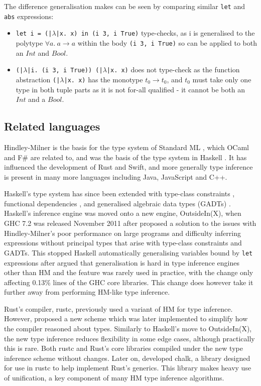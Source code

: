 \documentclass[a4paper,fleqn,oneside,12pt]{report}
\begin{document}
The difference generalisation makes can be seen by comparing similar \texttt{let} and \texttt{abs} expressions:
\begin{itemize}
  \item \texttt{let i = (|$\lambda$|x. x) in (i 3, i True)} type-checks, as i is generalised to the polytype $\forall a.\ a \rightarrow a$ within the body \texttt{(i 3, i True)} so can be applied to both an $Int$ and $Bool$.
  \item \texttt{(|$\lambda$|i. (i 3, i True)) (|$\lambda$|x. x)} does not type-check as the function abstraction \texttt{(|$\lambda$|x. x)} has the monotype $t_0 \rightarrow t_0$, and $t_0$ must take only one type in both tuple parts as it is not for-all qualified - it cannot be both an $Int$ and a $Bool$.
\end{itemize}

\subsection{Related languages}

Hindley-Milner is the basis for the type system of Standard ML \citep{ref15}, which OCaml and F\# are related to, and was the basis of the type system in Haskell \citep{ref16}. It has influenced the development of Rust and Swift, and more generally type inference is present in many more languages including Java, JavaScript and C++.

Haskell's type system has since been extended with type-class constraints \citep{ref17}, functional dependencies \citep{ref18}, and generalised algebraic data types (GADTs) \citep{ref19}. Haskell’s inference engine was moved onto a new engine, OutsideIn(X), when GHC 7.2 was released November 2011 after \cite{ref20} proposed a solution to the issues with Hindley-Milner’s poor performance on large programs and difficulty inferring expressions without principal types that arise with type-class constraints and GADTs. This stopped Haskell automatically generalising variables bound by \texttt{let} expressions after \cite{ref21} argued that generalisation is hard in type inference engines other than HM and the feature was rarely used in practice, with the change only affecting 0.13\% lines of the GHC core libraries. This change does however take it further away from performing HM-like type inference.

Rust’s compiler, rustc, previously used a variant of HM for type inference. However, \cite{ref22} proposed a new scheme which was later implemented to simplify how the compiler reasoned about types. Similarly to Haskell’s move to OutsideIn(X), the new type inference reduces flexibility in some edge cases, although practically this is rare. Both rustc and Rust’s core libraries compiled under the new type inference scheme without changes. Later on, \cite{ref23} developed chalk, a library designed for use in rustc to help implement Rust’s generics. This library makes heavy use of unification, a key component of many HM type inference algorithms.
\end{document}
